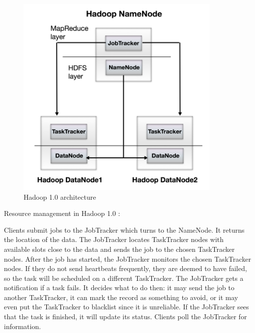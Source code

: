 \begin{figure}[H]
	\includegraphics[width=100mm, keepaspectratio]{figures/hadoop10.png}
	\centering
	\caption{Hadoop 1.0 architecture \cite{Hadoop1.0-problems}}
	\centering
\end{figure}

\iffalse\noindent Resource management in Hadoop 1.0 \cite{Hadoop1.0}:

Clients submit jobs to the JobTracker which turns to the NameNode. It returns the location of the data. The JobTracker locates TaskTracker nodes with available slots close to the data and sends the job to the chosen TaskTracker nodes. After the job has started, the JobTracker monitors the chosen TaskTracker nodes. If they do not send heartbeats frequently, they are deemed to have failed, so the task will be scheduled on a different TaskTracker. The JobTracker gets a notification if a task fails. It decides what to do then: it may send the job to another TaskTracker, it can mark the record as something to avoid, or it may even put the TaskTracker to blacklist since it is unreliable. If the JobTracker sees that the task is finished, it will update its status. Clients poll the JobTracker for information.

